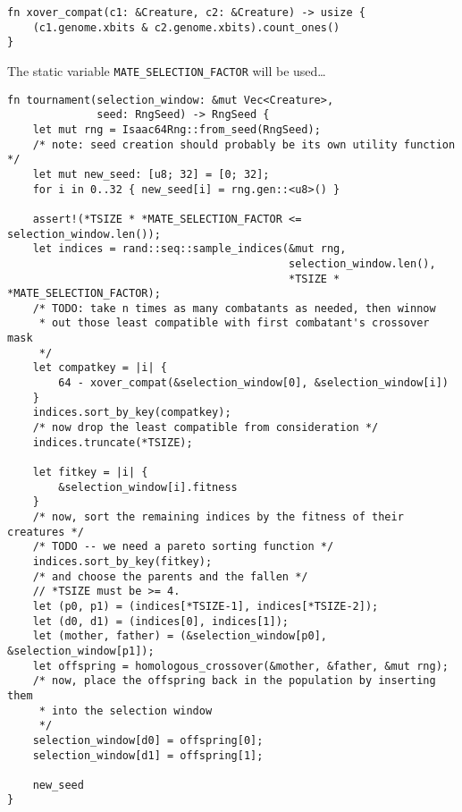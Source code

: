 \documentclass[11pt]{article}
\begin{document}
\lstset{language=rust,label=org629c022,caption= ,captionpos=b,numbers=none}
\begin{lstlisting}
fn xover_compat(c1: &Creature, c2: &Creature) -> usize {
    (c1.genome.xbits & c2.genome.xbits).count_ones()
}
\end{lstlisting}

The static variable \texttt{MATE\_SELECTION\_FACTOR} will be used\ldots{}

\lstset{language=rust,label=org4946d0e,caption= ,captionpos=b,numbers=none}
\begin{lstlisting}
fn tournament(selection_window: &mut Vec<Creature>,
              seed: RngSeed) -> RngSeed {
    let mut rng = Isaac64Rng::from_seed(RngSeed);
    /* note: seed creation should probably be its own utility function */
    let mut new_seed: [u8; 32] = [0; 32];
    for i in 0..32 { new_seed[i] = rng.gen::<u8>() }

    assert!(*TSIZE * *MATE_SELECTION_FACTOR <= selection_window.len());
    let indices = rand::seq::sample_indices(&mut rng,
                                            selection_window.len(),
                                            *TSIZE * *MATE_SELECTION_FACTOR);
    /* TODO: take n times as many combatants as needed, then winnow
     * out those least compatible with first combatant's crossover mask
     */
    let compatkey = |i| {
        64 - xover_compat(&selection_window[0], &selection_window[i])
    }
    indices.sort_by_key(compatkey);
    /* now drop the least compatible from consideration */
    indices.truncate(*TSIZE);

    let fitkey = |i| {
        &selection_window[i].fitness
    }
    /* now, sort the remaining indices by the fitness of their creatures */
    /* TODO -- we need a pareto sorting function */
    indices.sort_by_key(fitkey);
    /* and choose the parents and the fallen */
    // *TSIZE must be >= 4.
    let (p0, p1) = (indices[*TSIZE-1], indices[*TSIZE-2]);
    let (d0, d1) = (indices[0], indices[1]);
    let (mother, father) = (&selection_window[p0], &selection_window[p1]);
    let offspring = homologous_crossover(&mother, &father, &mut rng);
    /* now, place the offspring back in the population by inserting them
     * into the selection window
     */
    selection_window[d0] = offspring[0];
    selection_window[d1] = offspring[1];

    new_seed
}
\end{lstlisting}
\end{document}
